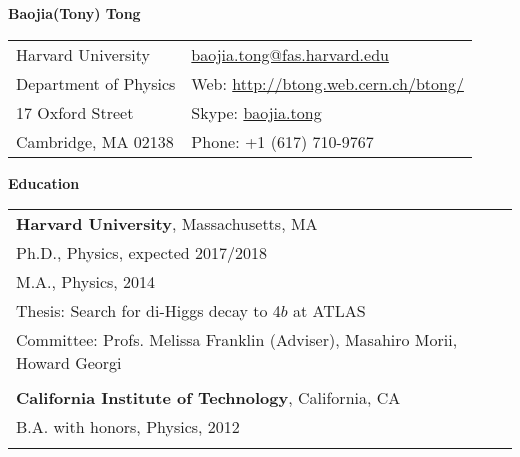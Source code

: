 \documentclass[letterpaper,11pt,oneside]{article}
\newcommand*{\Skype}{\href{skype:baojia.tong?add}{baojia.tong}}
\newcommand{\Absender}[1][\normalsize]{\Skype}
\newcommand{\blue}[1]{\textcolor[rgb]{0,0,0.9}{#1}}
\begin{document}

\noindent  \center \LARGE{\textbf{Baojia(Tony) Tong}}  \\
\vspace{1cm}
\normalsize
\begin{center}
\begin{tabular}{l l}
 Harvard University           & \hspace{1in} \href{mailto:baojia.tong@fas.harvard.edu}{baojia.tong@fas.harvard.edu} \\
 Department of Physics    & \hspace{1in} Web: \blue{\href{http://btong.web.cern.ch/btong/}{http://btong.web.cern.ch/btong/}}   \\
 17 Oxford Street              & \hspace{1in} Skype: \Absender  \\
 Cambridge, MA 02138     & \hspace{1in} Phone: +1 (617) 710-9767 \\
\end{tabular}
\end{center}
\noindent\makebox[\linewidth]{\rule{0.8\paperwidth}{1.5pt}}
\raggedright
\normalsize
\begin{flushleft}
\textbf{\Large{Education}} \\
\vspace{0.5cm}
 \begin{tabular}{@{} l}
     \textbf{Harvard University}, Massachusetts, MA \\
     Ph.D., Physics, expected 2017/2018 \\
     M.A., Physics, 2014 \\
     Thesis: Search for di-Higgs decay to 4$b$ at ATLAS \\
     Committee: Profs. Melissa Franklin (Adviser), Masahiro Morii, Howard Georgi \\
     \\
     \textbf{California Institute of Technology}, California, CA \\
     B.A. with honors, Physics, 2012 \\
     \\
 \end{tabular}
\end{flushleft}
\end{document}
